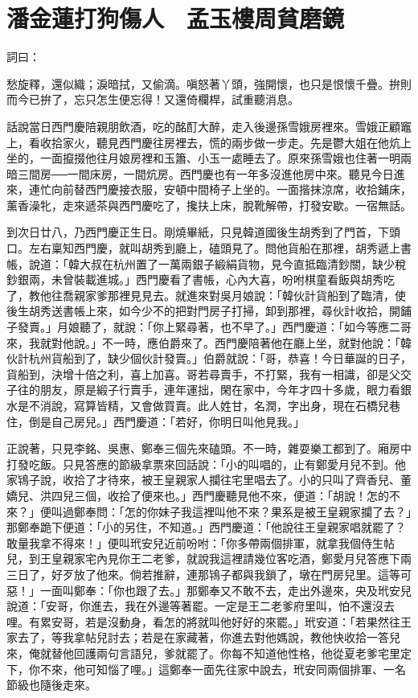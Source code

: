 %

\chapter{潘金蓮打狗傷人　孟玉樓周貧磨鏡}

詞曰：

愁旋釋，還似織；淚暗拭，又偷滴。嗔怒著丫頭，強開懷，也只是恨懷千疊。拚則而今已拚了，忘只怎生便忘得！又還倚欄桿，試重聽消息。

話說當日西門慶陪親朋飲酒，吃的酩酊大醉，走入後邊孫雪娥房裡來。雪娥正顧竈上，看收拾家火，聽見西門慶往房裡去，慌的兩步做一步走。先是鬱大姐在他炕上坐的，一面攛掇他往月娘房裡和玉簫、小玉一處睡去了。原來孫雪娥也住著一明兩暗三間房──一間床房，一間炕房。西門慶也有一年多沒進他房中來。聽見今日進來，連忙向前替西門慶接衣服，安頓中間椅子上坐的。一面揩抹涼席，收拾鋪床，薰香澡牝，走來遞茶與西門慶吃了，攙扶上床，脫靴解帶，打發安歇。一宿無話。

到次日廿八，乃西門慶正生日。剛燒畢紙，只見韓道國後生胡秀到了門首，下頭口。左右稟知西門慶，就叫胡秀到廳上，磕頭見了。問他貨船在那裡，胡秀遞上書帳，說道：「韓大叔在杭州置了一萬兩銀子緞絹貨物，見今直抵臨清鈔關，缺少稅鈔銀兩，未曾裝載進城。」西門慶看了書帳，心內大喜，吩咐棋童看飯與胡秀吃了，教他往喬親家爹那裡見見去。就進來對吳月娘說：「韓伙計貨船到了臨清，使後生胡秀送書帳上來，如今少不的把對門房子打掃，卸到那裡，尋伙計收拾，開鋪子發賣。」月娘聽了，就說：「你上緊尋著，也不早了。」西門慶道：「如今等應二哥來，我就對他說。」不一時，應伯爵來了。西門慶陪著他在廳上坐，就對他說：「韓伙計杭州貨船到了，缺少個伙計發賣。」伯爵就說：「哥，恭喜！今日華誕的日子，貨船到，決增十倍之利，喜上加喜。哥若尋賣手，不打緊，我有一相識，卻是父交子往的朋友，原是緞子行賣手，連年運拙，閑在家中，今年才四十多歲，眼力看銀水是不消說，寫算皆精，又會做買賣。此人姓甘，名潤，字出身，現在石橋兒巷住，倒是自己房兒。」西門慶道：「若好，你明日叫他見我。」

正說著，只見李銘、吳惠、鄭奉三個先來磕頭。不一時，雜耍樂工都到了。廂房中打發吃飯。只見答應的節級拿票來回話說：「小的叫唱的，止有鄭愛月兒不到。他家鴇子說，收拾了才待來，被王皇親家人攔往宅里唱去了。小的只叫了齊香兒、董嬌兒、洪四兒三個，收拾了便來也。」西門慶聽見他不來，便道：「胡說！怎的不來？」便叫過鄭奉問：「怎的你妹子我這裡叫他不來？果系是被王皇親家攔了去？」那鄭奉跪下便道：「小的另住，不知道。」西門慶道：「他說往王皇親家唱就罷了？敢量我拿不得來！」便叫玳安兒近前吩咐：「你多帶兩個排軍，就拿我個侍生帖兒，到王皇親家宅內見你王二老爹，就說我這裡請幾位客吃酒，鄭愛月兒答應下兩三日了，好歹放了他來。倘若推辭，連那鴇子都與我鎖了，墩在門房兒里。這等可惡！」一面叫鄭奉：「你也跟了去。」那鄭奉又不敢不去，走出外邊來，央及玳安兒說道：「安哥，你進去，我在外邊等著罷。一定是王二老爹府里叫，怕不還沒去哩。有累安哥，若是沒動身，看怎的將就叫他好好的來罷。」玳安道：「若果然往王家去了，等我拿帖兒討去；若是在家藏著，你進去對他媽說，教他快收拾一答兒來，俺就替他回護兩句言語兒，爹就罷了。你每不知道他性格，他從夏老爹宅里定下，你不來，他可知惱了哩。」這鄭奉一面先往家中說去，玳安同兩個排軍、一名節級也隨後走來。

